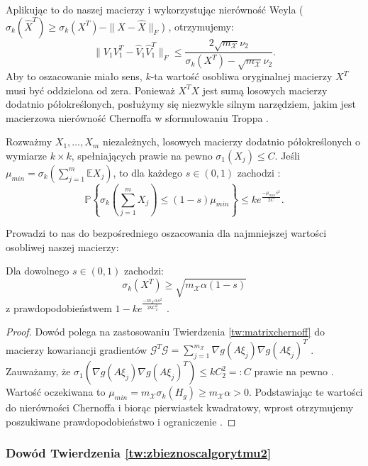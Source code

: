 Aplikując to do naszej macierzy i wykorzystując nierówność Weyla ($\sigma_k(\hat{X}^T) \ge \sigma_k(X^T) - \|X - \hat{X}\|_F$) , otrzymujemy:
$$\|V_1 V_1^T - \hat{V}_1 \hat{V}_1^T\|_F \le \frac{2\sqrt{m_\mathcal{X}}\nu_2}{\sigma_k(X^T) - \sqrt{m_\mathcal{X}}\nu_2}.$$
Aby to oszacowanie miało sens, $k$-ta wartość osobliwa oryginalnej macierzy $X^T$ musi być oddzielona od zera. Ponieważ $X^T X$ jest sumą losowych macierzy dodatnio półokreślonych, posłużymy się niezwykle silnym narzędziem, jakim jest macierzowa nierówność Chernoffa w sformułowaniu Troppa \cite{tropp2012user} .

\begin{tw}\label{tw:matrixchernoff}
Rozważmy $X_1, \dots, X_m$ niezależnych, losowych macierzy dodatnio półokreślonych o wymiarze $k \times k$, spełniających prawie na pewno $\sigma_1(X_j) \le C$. Jeśli $\mu_{min} = \sigma_k(\sum_{j=1}^m \mathbb{E}X_j)$, to dla każdego $s \in (0, 1)$ zachodzi :
$$\mathbb{P}\left\{\sigma_k\left(\sum_{j=1}^m X_j\right) \le (1-s)\mu_{min}\right\} \le k e^{\frac{-\mu_{min} s^2}{2C}}.$$

\end{tw}

Prowadzi to nas do bezpośredniego oszacowania dla najmniejszej wartości osobliwej naszej macierzy:

\begin{lm}\label{lm:wartoscosobliwaX}
Dla dowolnego $s \in (0,1)$ zachodzi:
$$\sigma_k(X^T) \ge \sqrt{m_\mathcal{X}\alpha(1-s)}$$
z prawdopodobieństwem $1 - k e^{\frac{-m_\mathcal{X}\alpha s^2}{2kC_2^2}}$ .
\end{lm}

\begin{proof}
Dowód polega na zastosowaniu Twierdzenia \ref{tw:matrixchernoff} do macierzy kowariancji gradientów $\mathcal{G}^T \mathcal{G} = \sum_{j=1}^{m_\mathcal{X}} \nabla g(A\xi_j)\nabla g(A\xi_j)^T$ . Zauważamy, że $\sigma_1(\nabla g(A\xi_j)\nabla g(A\xi_j)^T) \le kC_2^2 =: C$ prawie na pewno . Wartość oczekiwana to $\mu_{min} = m_\mathcal{X}\sigma_k(H_g) \ge m_\mathcal{X}\alpha > 0$. Podstawiając te wartości do nierówności Chernoffa i biorąc pierwiastek kwadratowy, wprost otrzymujemy poszukiwane prawdopodobieństwo i ograniczenie .
\end{proof}

\subsubsection{Dowód Twierdzenia \ref{tw:zbieznoscalgorytmu2}}


